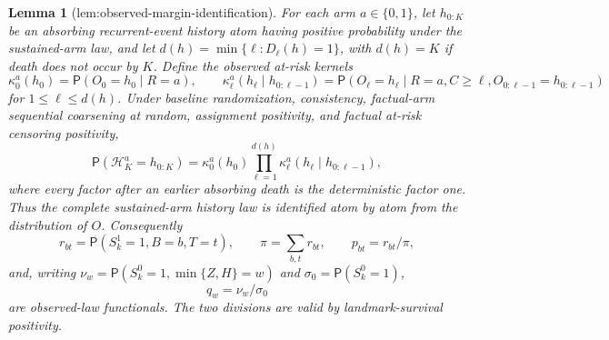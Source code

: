 \documentclass{article}
\newtheorem{lemma}{Lemma}
\begin{document}
\begin{lemma}[lem:observed-margin-identification]\label{lem:observed-margin-identification}
For each arm \(a\in\{0,1\}\), let \(h_{0:K}\) be an absorbing recurrent-event history atom having positive probability under the sustained-arm law, and let \(d(h)=\min\{\ell:D_\ell(h)=1\}\), with \(d(h)=K\) if death does not occur by \(K\).  Define the observed at-risk kernels
\[
 \kappa_0^a(h_0)=\mathsf P(O_0=h_0\mid R=a),
 \qquad
 \kappa_\ell^a(h_\ell\mid h_{0:\ell-1})
 =\mathsf P(O_\ell=h_\ell\mid R=a,C\ge\ell,
                    O_{0:\ell-1}=h_{0:\ell-1})
\]
for \(1\le\ell\le d(h)\).  Under baseline randomization, consistency, factual-arm sequential coarsening at random, assignment positivity, and factual at-risk censoring positivity,
\[
 \mathsf P(\mathcal H_K^a=h_{0:K})
 =\kappa_0^a(h_0)
   \prod_{\ell=1}^{d(h)}
       \kappa_\ell^a(h_\ell\mid h_{0:\ell-1}),
\]
where every factor after an earlier absorbing death is the deterministic factor one.  Thus the complete sustained-arm history law is identified atom by atom from the distribution of \(O\).  Consequently
\[
 r_{bt}=\mathsf P(S_k^1=1,B=b,T=t),\qquad
 \pi=\sum_{b,t}r_{bt},\qquad p_{bt}=r_{bt}/\pi,
\]
and, writing \(\nu_w=\mathsf P(S_k^0=1,\min\{Z,H\}=w)\) and
\(\sigma_0=\mathsf P(S_k^0=1)\),
\[
 q_w=\nu_w/\sigma_0
\]
are observed-law functionals.  The two divisions are valid by landmark-survival positivity.
\end{lemma}
\end{document}
